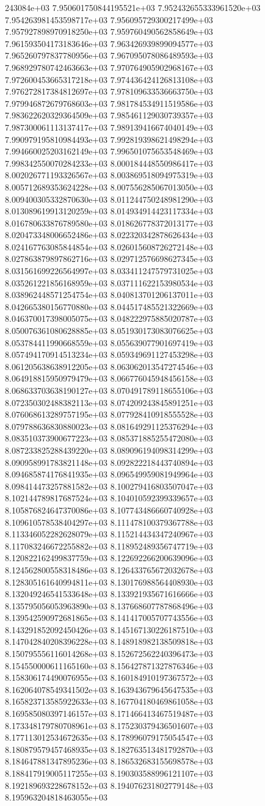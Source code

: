 243084e+03	7.950601750844195521e+03	7.952432655333961520e+03	7.954263981453598717e+03	7.956095729300217499e+03	7.957927898970918250e+03	7.959760490562858649e+03	7.961593504173183646e+03	7.963426939899094577e+03	7.965260797837780956e+03	7.967095078086489593e+03	7.968929780742463663e+03	7.970764905902968167e+03	7.972600453665317218e+03	7.974436424126813108e+03	7.976272817384812697e+03	7.978109633536663750e+03	7.979946872679768603e+03	7.981784534911519586e+03	7.983622620329364509e+03	7.985461129030739357e+03	7.987300061113137417e+03	7.989139416674040149e+03	7.990979195810984493e+03	7.992819398621498294e+03	7.994660025203162149e+03	7.996501075653548469e+03	7.998342550070284233e+03	8.000184448550986417e+03	8.002026771193326567e+03	8.003869518094975319e+03	8.005712689353624228e+03	8.007556285067013050e+03	8.009400305332870630e+03	8.011244750248981290e+03	8.013089619913120259e+03	8.014934914423117334e+03	8.016780633876789580e+03	8.018626778372013177e+03	8.020473348006652486e+03	8.022320342878626434e+03	8.024167763085844854e+03	8.026015608726272148e+03	8.027863879897862716e+03	8.029712576698627345e+03	8.031561699226564997e+03	8.033411247579731025e+03	8.035261221856168959e+03	8.037111622153980534e+03	8.038962448571254754e+03	8.040813701206137011e+03	8.042665380156770880e+03	8.044517485521322669e+03	8.046370017398005075e+03	8.048222975885020787e+03	8.050076361080628885e+03	8.051930173083076625e+03	8.053784411990668559e+03	8.055639077901697419e+03	8.057494170914513234e+03	8.059349691127453298e+03	8.061205638638912205e+03	8.063062013547274546e+03	8.064918815950979479e+03	8.066776045948456158e+03	8.068633703638190127e+03	8.070491789118655106e+03	8.072350302488382113e+03	8.074209243845891251e+03	8.076068613289757195e+03	8.077928410918555528e+03	8.079788636830880023e+03	8.081649291125376294e+03	8.083510373900677223e+03	8.085371885255472080e+03	8.087233825288439220e+03	8.089096194098314299e+03	8.090958991783821148e+03	8.092822218443740894e+03	8.094685874176841935e+03	8.096549959081949964e+03	8.098414473257881582e+03	8.100279416803507047e+03	8.102144789817687524e+03	8.104010592399339657e+03	8.105876824647370086e+03	8.107743486660740928e+03	8.109610578538404297e+03	8.111478100379367788e+03	8.113346052282628079e+03	8.115214434347240967e+03	8.117083246672255882e+03	8.118952489356747719e+03	8.120822162499837759e+03	8.122692266200639096e+03	8.124562800558318486e+03	8.126433765672032678e+03	8.128305161640994811e+03	8.130176988564408930e+03	8.132049246541533648e+03	8.133921935671616666e+03	8.135795056053963890e+03	8.137668607787868496e+03	8.139542590972681865e+03	8.141417005707743556e+03	8.143291852092450426e+03	8.145167130226187510e+03	8.147042840208396228e+03	8.148918982138509818e+03	8.150795556116014268e+03	8.152672562240396473e+03	8.154550000611165160e+03	8.156427871327876346e+03	8.158306174490076955e+03	8.160184910197367572e+03	8.162064078549341502e+03	8.163943679645647535e+03	8.165823713585922633e+03	8.167704180469861058e+03	8.169585080397146157e+03	8.171466413467519487e+03	8.173348179780708961e+03	8.175230379436501607e+03	8.177113012534672635e+03	8.178996079175054547e+03	8.180879579457468935e+03	8.182763513481792870e+03	8.184647881347895236e+03	8.186532683155698578e+03	8.188417919005117255e+03	8.190303588996121107e+03	8.192189693228678152e+03	8.194076231802779148e+03	8.195963204818463055e+03	